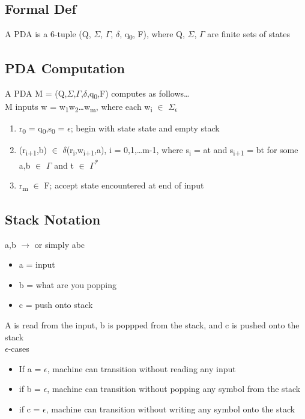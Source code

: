 \documentclass[11pt]{article}
\begin{document}
\subsection{Formal Def}
\label{sec:orgcf5d17a}
A PDA is a 6-tuple (Q, \(\Sigma\), \(\Gamma\), \(\delta\), q\textsubscript{0}, F), where Q, \(\Sigma\), \(\Gamma\) are finite sets of states\\
\subsection{PDA Computation}
\label{sec:orgd9d14c8}
A PDA M = (Q,\(\Sigma\),\(\Gamma\),\(\delta\),q\textsubscript{0},F) computes as follows\ldots{}\\
M inputs w = w\textsubscript{1}w\textsubscript{2}\ldots{}w\textsubscript{m}, where each w\textsubscript{i} \(\in\) \(\Sigma\)\textsubscript{\(\epsilon\)}\\
\begin{enumerate}
\item r\textsubscript{0} = q\textsubscript{0},s\textsubscript{0} = \(\epsilon\); begin with state state and empty stack\\
\item (r\textsubscript{i+1},b) \(\in\) \(\delta\)(r\textsubscript{i},w\textsubscript{i+1},a), i = 0,1,\ldots{}m-1, where s\textsubscript{i} = at and s\textsubscript{i+1} = bt for some a,b \(\in\) \(\Gamma\) and t \(\in\) \(\Gamma\)\textsuperscript{*}\\
\item r\textsubscript{m} \(\in\) F; accept state encountered at end of input\\
\end{enumerate}
\subsection{Stack Notation}
\label{sec:orgb559536}
a,b \(\rightarrow\) or simply abc\\
\begin{itemize}
\item a = input\\
\item b = what are you popping\\
\item c = push onto stack\\
\end{itemize}
A is read from the input, b is poppped from the stack, and c is pushed onto the stack\\
\(\epsilon\)-cases\\
\begin{itemize}
\item If a = \(\epsilon\), machine can transition without reading any input\\
\item if b = \(\epsilon\), machine can transition without popping any symbol from the stack\\
\item if c = \(\epsilon\), machine can transition without writing any symbol onto the stack\\
\end{itemize}
\end{document}
